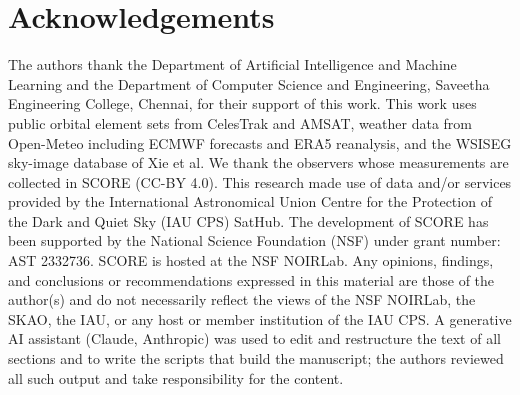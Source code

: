 \documentclass[conference]{IEEEtran}
\begin{document}
\section*{Acknowledgements}
The authors thank the Department of Artificial Intelligence and Machine Learning
and the Department of Computer Science and Engineering, Saveetha Engineering
College, Chennai, for their support of this work. This work uses public orbital
element sets from CelesTrak and AMSAT, weather data from Open-Meteo including
ECMWF forecasts and ERA5 reanalysis, and the WSISEG sky-image database of
Xie et al. We thank the observers whose measurements are collected in SCORE
(CC-BY 4.0). This research made use of data and/or services provided by the
International Astronomical Union Centre for the Protection of the Dark and Quiet
Sky (IAU CPS) SatHub. The development of SCORE has been supported by the
National Science Foundation (NSF) under grant number: AST 2332736. SCORE is
hosted at the NSF NOIRLab. Any opinions, findings, and conclusions or
recommendations expressed in this material are those of the author(s) and do not
necessarily reflect the views of the NSF NOIRLab, the SKAO, the IAU, or any host
or member institution of the IAU CPS. A generative AI assistant
(Claude, Anthropic) was used to edit and restructure the text of all sections
and to write the scripts that build the manuscript; the authors reviewed all
such output and take responsibility for the content.

\balance


\end{document}
